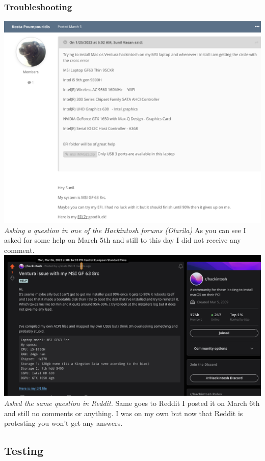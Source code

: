 \documentclass[12pt, letterpaper]{article}
\begin{document}
\subsubsection{Troubleshooting}
\includegraphics[width=1\textwidth]{fotos/PSP/Research/Oralira post.jpeg}
\break
\emph{Asking a question in one of the Hackintosh forums (Olarila)}
\hfill\break
\hfill\break
As you can see I asked for some help on March 5th and still to this day I did not receive any comment.\hfill\break
\includegraphics[width=\textwidth]{fotos/PSP/Research/Reddit post.jpeg}
\break
\emph{Asked the same question in Reddit.}
\hfill\break
\hfill\break
Same goes to Reddit I posted it on March 6th and still no comments or anything. I was on my own but now that Reddit is protesting you won't get any answers.
\newpage
\subsection{Testing}
\end{document}
